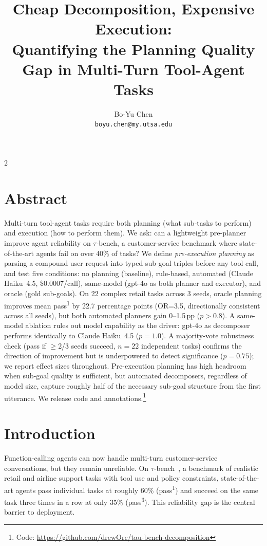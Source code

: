 \documentclass[11pt,a4paper]{article}
\title{\textbf{Cheap Decomposition, Expensive Execution:\\Quantifying the Planning Quality Gap in Multi-Turn Tool-Agent Tasks}}
\author{
  Bo-Yu Chen\\
  \texttt{boyu.chen@my.utsa.edu}
}
\date{}
\begin{document}
\maketitle
\begin{multicols}{2}

\section*{Abstract}

Multi-turn tool-agent tasks require both planning (what sub-tasks to perform) and execution (how to perform them). We ask: can a lightweight pre-planner improve agent reliability on $\tau$-bench, a customer-service benchmark where state-of-the-art agents fail on over 40\% of tasks? We define \emph{pre-execution planning} as parsing a compound user request into typed sub-goal triples before any tool call, and test five conditions: no planning (baseline), rule-based, automated (Claude Haiku~4.5, \$0.0007/call), same-model (gpt-4o as both planner and executor), and oracle (gold sub-goals). On 22 complex retail tasks across 3 seeds, oracle planning improves mean pass\textsuperscript{1} by 22.7 percentage points (OR=3.5, directionally consistent across all seeds), but both automated planners gain 0--1.5\,pp ($p>0.8$). A same-model ablation rules out model capability as the driver: gpt-4o as decomposer performs identically to Claude Haiku~4.5 ($p=1.0$). A majority-vote robustness check (pass if $\geq$2/3 seeds succeed, $n=22$ independent tasks) confirms the direction of improvement but is underpowered to detect significance ($p=0.75$); we report effect sizes throughout. Pre-execution planning has high headroom when sub-goal quality is sufficient, but automated decomposers, regardless of model size, capture roughly half of the necessary sub-goal structure from the first utterance. We release code and annotations.\footnote{Code: \url{https://github.com/drewOrc/tau-bench-decomposition}}


\section{Introduction}

Function-calling agents can now handle multi-turn customer-service conversations, but they remain unreliable. On $\tau$-bench~\citep{yao2024tau}, a benchmark of realistic retail and airline support tasks with tool use and policy constraints, state-of-the-art agents pass individual tasks at roughly 60\% (pass\textsuperscript{1}) and succeed on the same task three times in a row at only 35\% (pass\textsuperscript{3}). This reliability gap is the central barrier to deployment.


\end{multicols}
\end{document}
